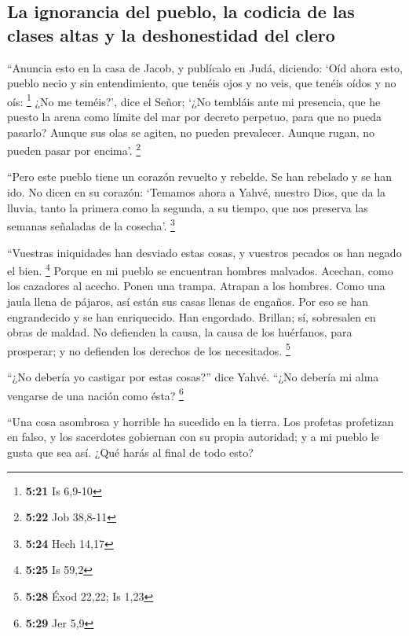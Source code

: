 \begin{paracol}{2}
{\subsection{La ignorancia del pueblo, la codicia de las clases altas y
la deshonestidad del
clero}\label{la-ignorancia-del-pueblo-la-codicia-de-las-clases-altas-y-la-deshonestidad-del-clero}}

 ``Anuncia esto en la casa de Jacob, y publícalo en Judá,
diciendo:  `Oíd ahora esto, pueblo necio y sin
entendimiento, que tenéis ojos y no veis, que tenéis oídos y no oís:
\footnote{\textbf{5:21} Is 6,9-10}  ¿No me teméis?', dice
el Señor; `¿No tembláis ante mi presencia, que he puesto la arena como
límite del mar por decreto perpetuo, para que no pueda pasarlo? Aunque
sus olas se agiten, no pueden prevalecer. Aunque rugan, no pueden pasar
por encima'. \footnote{\textbf{5:22} Job 38,8-11}

 ``Pero este pueblo tiene un corazón revuelto y rebelde.
Se han rebelado y se han ido.  No dicen en su corazón:
`Temamos ahora a Yahvé, nuestro Dios, que da la lluvia, tanto la primera
como la segunda, a su tiempo, que nos preserva las semanas señaladas de
la cosecha'. \footnote{\textbf{5:24} Hech 14,17}

 ``Vuestras iniquidades han desviado estas cosas, y
vuestros pecados os han negado el bien. \footnote{\textbf{5:25} Is 59,2}
 Porque en mi pueblo se encuentran hombres malvados.
Acechan, como los cazadores al acecho. Ponen una trampa. Atrapan a los
hombres.  Como una jaula llena de pájaros, así están sus
casas llenas de engaños. Por eso se han engrandecido y se han
enriquecido.  Han engordado. Brillan; sí, sobresalen en
obras de maldad. No defienden la causa, la causa de los huérfanos, para
prosperar; y no defienden los derechos de los necesitados. \footnote{\textbf{5:28}
  Éxod 22,22; Is 1,23}

 ``¿No debería yo castigar por estas cosas?'' dice Yahvé.
``¿No debería mi alma vengarse de una nación como ésta? \footnote{\textbf{5:29}
  Jer 5,9}

 ``Una cosa asombrosa y horrible ha sucedido en la
tierra.  Los profetas profetizan en falso, y los
sacerdotes gobiernan con su propia autoridad; y a mi pueblo le gusta que
sea así. ¿Qué harás al final de todo esto?

\switchcolumn
\begin{otherlanguage}{english}


\end{otherlanguage}
\end{paracol}
